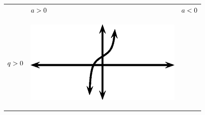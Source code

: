         \begin{center}
      \label{m39414*uid86}
    \noindent
      \tablelasttail{}
      \begin{xtabular*}{\mytablewidth}[t]{|p{10\mystarwidth}|p{10\mystarwidth}|p{10\mystarwidth}|}\hline
         &
                  $a>{}0$
                 &
                  $a<{}0$
     \tabularnewline{}
                  $q>{}0$
                 &
    \setcounter{subfigure}{0}
\label{m39414*id90981}
    \begin{center}
    \label{m39414*id90981!!!underscore!!!media}\label{m39414*id90981!!!underscore!!!printimage}\includegraphics{col11306.imgs/m39414_MG10C15_034.png} %
      \vspace{2pt}
    \vspace{.1in}
    \end{center}    
                 &

\end{xtabular*}
\end{center}
